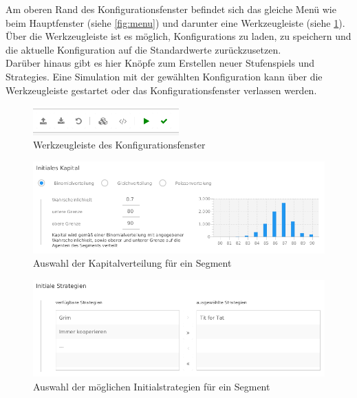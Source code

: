 \documentclass[parskip=full,11pt]{scrartcl}
\begin{document}
Am oberen Rand des Konfigurationsfenster befindet sich das gleiche Menü wie beim Hauptfenster (siehe \cref{fig:menu}) und darunter eine Werkzeugleiste (siehe \cref{fig:konfig_tool}). Über die Werkzeugleiste ist es möglich, \Glspl{Konfiguration} zu laden, zu speichern und die \Gls{aktuelle Konfiguration} auf die Standardwerte zurückzusetzen.\\Darüber hinaus gibt es hier Knöpfe zum Erstellen neuer \Glspl{Stufenspiel} und \Glspl{Strategie}. Eine Simulation mit der gewählten \Gls{Konfiguration} kann über die Werkzeugleiste gestartet oder das Konfigurationsfenster verlassen werden.

\begin{figure}[hb]
	\centering
	\includegraphics[width=0.5\textwidth]{images/konfig_tool2.png}
	\caption{\label{fig:konfig_tool}
		Werkzeugleiste des Konfigurationsfenster}
\end{figure}

\begin{figure}[hb]
	\centering
	\includegraphics[width=\textwidth]{images/konfig_cap.png}
	\caption{\label{fig:konfig_cap}
		Auswahl der Kapitalverteilung für ein Segment}
\end{figure}

\begin{figure}[hb]
	\centering
	\includegraphics[width=\textwidth]{images/konfig_strat.png}
	\caption{\label{fig:konfig_strat}
		Auswahl der möglichen Initialstrategien für ein Segment}
\end{figure}
\end{document}
